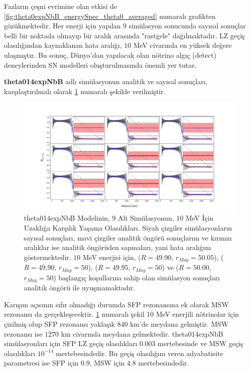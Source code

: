 Fazların çeşni evrimine olan etkisi de \ref{fig:theta0expNbB_energySpec_theta0_averaged} numaralı grafikten gözükmektedir. Her enerji için yapılan 9 simülasyon sonucunda sayısal sonuçlar belli bir noktada olmayıp bir aralık arasında "rastgele" dağılmaktadır. LZ geçiş olasılığından kaynaklanan hata aralığı, $ 10 $ MeV civarında en yüksek değere ulaşmıştır. Bu sonuç, Dünya'dan yapılacak olan nötrino algıç (detect) deneylerinden SN modelleri oluşturulmasında önemli yer tutar.

\textbf{theta014expNbB} adlı simülasyonun analitik ve sayısal sonuçları, karşılaştırılmalı olarak \ref{fig:theta014expNbB_9x9_10MeV} numaralı şekilde verilmiştir.

\begin{figure}[hbt!]
    \centering
    \includegraphics[width=\textwidth]{figures/theta014expNbB_9x9_10MeV.pdf}
    \caption[theta014expNbB Modelinin, 9 Alt Simülasyonun, $ 10 $ MeV İçin Uzaklığa Karşılık Yaşama Olasılıkları]{theta014expNbB Modelinin, 9 Alt Simülasyonun, $ 10 $ MeV İçin Uzaklığa Karşılık Yaşama Olasılıkları. Siyah çizgiler simülasyonların sayısal sonuçları, mavi çizgiler analitik öngörü sonuçlarını ve kırmızı aralıklar ise analitik öngörüden sapmaları, yani hata aralığını göstermektedir. $ 10 $ MeV enerjisi için, ($ R=49.90 $, $ r_{Mag}=50.05 $), ($ R= 49.90$, $ r_{Mag}=50 $), ($ R= 49.95$, $ r_{Mag}=50 $) ve ($ R= 50.00$, $ r_{Mag}=50 $) başlangıç koşullarına sahip olan simülasyon sonuçları analitik öngörü ile uyuşmamaktadır.}
    \label{fig:theta014expNbB_9x9_10MeV}
\end{figure}

Karışım açısının sıfır olmadığı durumda SFP rezonansına ek olarak MSW rezonansı da gerçekleşecektir. \ref{fig:theta014expNbB_9x9_10MeV} numaralı şekil $ 10 $ MeV enerjili nötrinolar için çizilmiş olup SFP rezonansı yaklaşık $840$ km'de meydana gelmiştir. MSW rezonansı ise $ 1270 $ km civarında meydana gelmektedir. theta014expNbB simülasyonları için SFP LZ geçiş olasılıkları $ 0.003 $ mertebesinde ve MSW geçiş olasılıkları $ 10^{-14} $ mertebesindedir. Bu geçiş olasılığını veren adyabatisite parametresi ise SFP için $ 0.9 $, MSW için $ 4.8 $ mertebesindedir.

